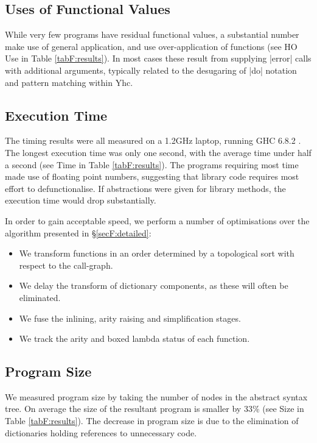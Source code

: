 \subsection{Uses of Functional Values}

While very few programs have residual functional values, a substantial number make use of general application, and use over-application of functions (see HO Use in Table \ref{tabF:results}). In most cases these result from supplying |error| calls with additional arguments, typically related to the desugaring of |do| notation and pattern matching within Yhc.

\subsection{Execution Time}
\label{secF:time}

The timing results were all measured on a 1.2GHz laptop, running GHC 6.8.2 \cite{ghc}. The longest execution time was only one second, with the average time under half a second (see Time in Table \ref{tabF:results}). The programs requiring most time made use of floating point numbers, suggesting that library code requires most effort to defunctionalise. If abstractions were given for library methods, the execution time would drop substantially.

In order to gain acceptable speed, we perform a number of optimisations over the algorithm presented in \S\ref{secF:detailed}:

\begin{itemize}
\item We transform functions in an order determined by a topological sort with respect to the call-graph.
\item We delay the transform of dictionary components, as these will often be eliminated.
\item We fuse the inlining, arity raising and simplification stages.
\item We track the arity and boxed lambda status of each function.
\end{itemize}

\subsection{Program Size}

We measured program size by taking the number of nodes in the abstract syntax tree. On average the size of the resultant program is smaller by 33\% (see Size in Table \ref{tabF:results}). The decrease in program size is due to the elimination of dictionaries holding references to unnecessary code.


